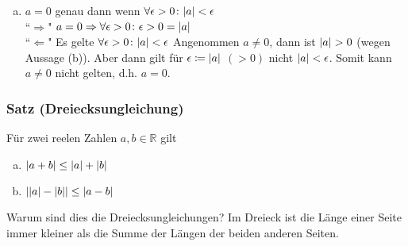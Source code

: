 \documentclass{article}
\begin{document}
\begin{enumerate}[(a)]
\item $a = 0$ genau dann wenn $\forall \epsilon > 0 \colon \abs{a} < \epsilon$ \\
  ``$\Rightarrow$" $a = 0 \Rightarrow \forall \epsilon > 0 \colon \epsilon > 0 = \abs{a}$ \\
  ``$\Leftarrow$" Es gelte $\forall \epsilon > 0 \colon \abs{a} < \epsilon$ Angenommen $a \ne 0$, dann
  ist $\abs{a} > 0$ (wegen Aussage (b)). Aber dann gilt für $\epsilon \coloneqq \abs{a}$ $(>0)$ nicht $\abs{a} < \epsilon$.
  Somit kann $a \ne 0$ nicht gelten, d.h. $a = 0$.
\end{enumerate}

\subsubsection{Satz (Dreiecksungleichung)}

Für zwei reelen Zahlen $a,b \in \mathbb{R}$ gilt
\begin{enumerate}[(a)]
\item $\abs{a + b} \leq \abs{a} + \abs{b}$
\item $\abs{\abs{a} - \abs{b}}  \leq \abs{a - b}$
\end{enumerate}

\noindent
Warum sind dies die Dreiecksungleichungen? Im Dreieck ist die Länge einer Seite immer kleiner als die Summe der Längen
der beiden anderen Seiten.
\end{document}
